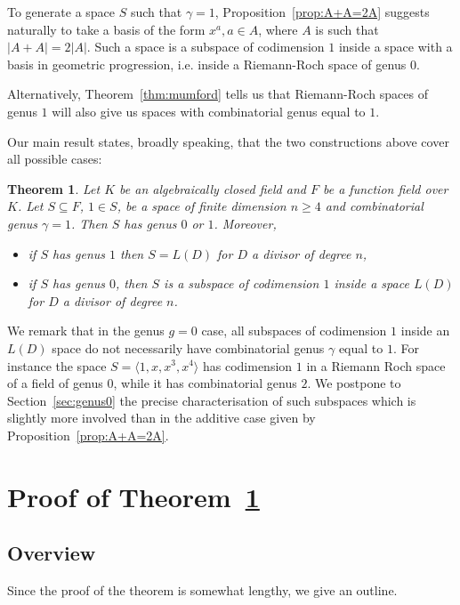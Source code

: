 \documentclass{article}
\theoremstyle{plain}
\newtheorem{thm}{Theorem}[section]
\theoremstyle{definition}
\theoremstyle{remark}
\renewcommand{\geq}{\geqslant}
\begin{document}
To generate a space $S$ such that $\gamma=1$, Proposition~\ref{prop:A+A=2A}
suggests naturally to take a basis of the form $x^a, a\in A$, where
$A$ is such that $|A+A|=2|A|$. Such a space is a subspace of
codimension $1$ inside a space with a basis in geometric progression,
i.e. inside a Riemann-Roch space of genus $0$.

Alternatively, Theorem~\ref{thm:mumford} tells
us that Riemann-Roch spaces of genus $1$ will also give us
spaces with combinatorial genus equal to
$1$.

Our main result states, broadly speaking, that the two
constructions above cover all possible cases:

\begin{thm}\label{thm:main}
  { Let $K$ be an algebraically closed field
  and $F$ be a function field over $K$.}
  Let $S \subseteq F$, $1\in S$, be a space of finite dimension
  $n \geq 4$ and combinatorial genus $\gamma=1$. Then $S$ has genus
  $0$ or $1$. Moreover,
  \begin{itemize}
    \item if $S$ has genus $1$  then $S=L(D)$ for $D$ a divisor of degree $n$,
    \item if $S$ has genus $0$, then $S$ is a subspace of codimension
      $1$ inside a space $L(D)$ for $D$ a divisor of degree $n$.
  \end{itemize}
 \end{thm}

We remark that in the genus $g=0$ case, all subspaces of codimension
$1$ inside an $L(D)$
space do not necessarily have combinatorial genus $\gamma$ equal to
$1$. 
{ For instance the space $S = \langle 1, x, x^3, x^4 \rangle$
has codimension $1$ in a Riemann Roch space of a field of genus
$0$, while it has combinatorial genus $2$.}
We postpone to Section~\ref{sec:genus0} the precise
characterisation of such subspaces which is slightly more involved
than in the additive case given by Proposition~\ref{prop:A+A=2A}.


\section{Proof of Theorem~\ref{thm:main}}\label{sec:proof_main}

\subsection{Overview}
Since the proof of the theorem is somewhat lengthy, we give an
outline.
\end{document}
